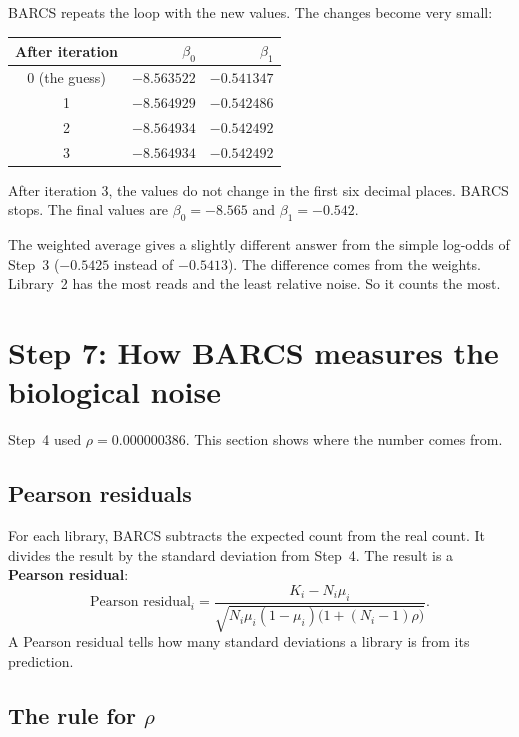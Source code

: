 \documentclass[12pt]{article}
\begin{document}
BARCS repeats the loop with the new values. The changes become very small:

\begin{center}
\begin{tabular}{crr}
\toprule
After iteration & $\beta_0$ & $\beta_1$\\
\midrule
0 (the guess) & $-8.563522$ & $-0.541347$\\
1 & $-8.564929$ & $-0.542486$\\
2 & $-8.564934$ & $-0.542492$\\
3 & $-8.564934$ & $-0.542492$\\
\bottomrule
\end{tabular}
\end{center}

After iteration 3, the values do not change in the first six decimal places.
BARCS stops. The final values are $\beta_0 = -8.565$ and
$\beta_1 = -0.542$.

\begin{remember}
The weighted average gives a slightly different answer from the simple
log-odds of Step~3 ($-0.5425$ instead of $-0.5413$). The difference comes
from the weights. Library~2 has the most reads and the least relative noise.
So it counts the most.
\end{remember}

\section{Step 7: How BARCS measures the biological noise}

Step~4 used $\rho = 0.000000386$. This section shows where the number comes
from.

\subsection{Pearson residuals}

For each library, BARCS subtracts the expected count from the real count.
It divides the result by the standard deviation from Step~4. The result is a
\textbf{Pearson residual}:
\[
\text{Pearson residual}_i =
\frac{K_i - N_i\mu_i}{\sqrt{N_i\mu_i(1-\mu_i)\bigl(1 + (N_i-1)\rho\bigr)}}.
\]
A Pearson residual tells how many standard deviations a library is from its
prediction.

\subsection{The rule for \texorpdfstring{$\rho$}{rho}}
\end{document}
